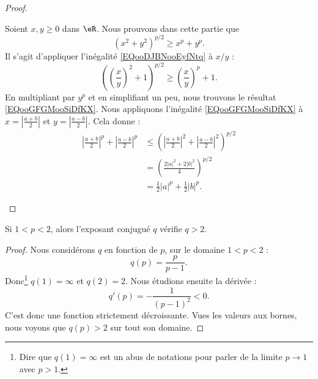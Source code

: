 \begin{proof}
\begin{subproof}
        Soient \( x,y\geq 0\) dans \( \eR\). Nous prouvons dans cette partie que
        \begin{equation}        \label{EQooGFGMooSiDfKX}
            (x^2+y^2)^{p/2}\geq x^p+y^p.
        \end{equation}
        Il s'agit d'appliquer l'inégalité \eqref{EQooDJBNooEyfNtq} à \( x/y\) :
        \begin{equation}
            \left( \left( \frac{ x }{ y } \right)^2+1 \right)^{p/2}\geq \left( \frac{ x }{ y } \right)^p+1.
        \end{equation}
        En multipliant par \( y^p\) et en simplifiant un peu, nous trouvons le résultat \eqref{EQooGFGMooSiDfKX}.
        \spitem[Avec \( a,b\in \eC\)]
        Nous appliquons l'inégalité \eqref{EQooGFGMooSiDfKX} à \( x=| \frac{ a+b }{ 2 } |\) et \( y=| \frac{ a-b }{2} |\). Cela donne :
        \begin{subequations}
            \begin{align}
                \left| \frac{ a+b }{2} \right|^p+\left| \frac{ a-b }{2} \right|^p & \leq \left( \left| \frac{ a+b }{2} \right|^2+\left| \frac{ a-b }{2} \right|^2 \right)^{p/2} \\
                                                                                  & =\left( \frac{ 2| a |^2+2| b |^2 }{ 4 } \right)^{p/2}                                       \\
                                                                                  & =\frac{ 1 }{2}| a |^p+\frac{ 1 }{2}| b |^p.
            \end{align}
        \end{subequations}
    \end{subproof}
\end{proof}

\begin{lemma}       \label{LEMooFGKXooZCHNln}
    Si \( 1<p<2\), alors l'exposant conjugué \( q\) vérifie \( q>2\).
\end{lemma}

\begin{proof}
    Nous considérons \( q\) en fonction de \( p\), sur le domaine \( 1<p<2\) :
    \begin{equation}
        q(p)=\frac{ p }{ p-1 }.
    \end{equation}
    Donc\footnote{Dire que \( q(1)=\infty\) est un abus de notations pour parler de la limite \( p\to 1\) avec \( p>1\).} \( q(1)=\infty\) et \( q(2)=2\). Nous étudions ensuite la dérivée :
    \begin{equation}
        q'(p)=-\frac{1}{ (p-1)^2 }<0.
    \end{equation}
    C'est donc une fonction strictement décroissante. Vues les valeurs aux bornes, nous voyons que \( q(p)>2\) sur tout son domaine.   
\end{proof}


